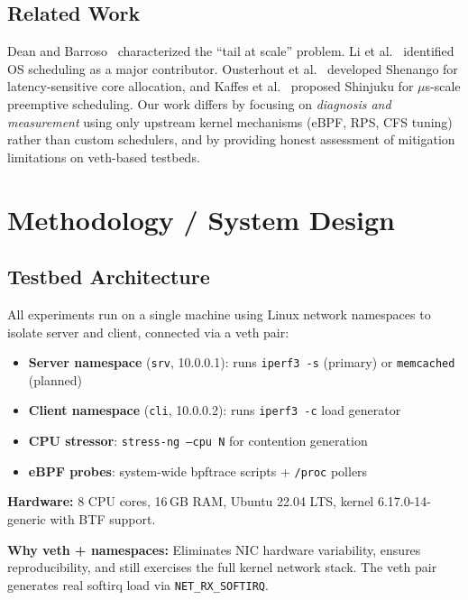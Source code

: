 \documentclass[11pt,a4paper]{article}
\begin{document}
\subsection{Related Work}

Dean and Barroso~\cite{dean2013tail} characterized the ``tail at scale'' problem. Li et al.~\cite{li2014tales} identified OS scheduling as a major contributor. Ousterhout et al.~\cite{ousterhout2019shenango} developed Shenango for latency-sensitive core allocation, and Kaffes et al.~\cite{kaffes2019shinjuku} proposed Shinjuku for $\mu$s-scale preemptive scheduling. Our work differs by focusing on \emph{diagnosis and measurement} using only upstream kernel mechanisms (eBPF, RPS, CFS tuning) rather than custom schedulers, and by providing honest assessment of mitigation limitations on veth-based testbeds.


\section{Methodology / System Design}
\label{sec:methodology}

\subsection{Testbed Architecture}

All experiments run on a single machine using Linux network namespaces to isolate server and client, connected via a veth pair:

\begin{itemize}[leftmargin=*]
  \item \textbf{Server namespace} (\texttt{srv}, 10.0.0.1): runs \texttt{iperf3 -s} (primary) or \texttt{memcached} (planned)
  \item \textbf{Client namespace} (\texttt{cli}, 10.0.0.2): runs \texttt{iperf3 -c} load generator
  \item \textbf{CPU stressor}: \texttt{stress-ng --cpu N} for contention generation
  \item \textbf{eBPF probes}: system-wide bpftrace scripts + \texttt{/proc} pollers
\end{itemize}

\textbf{Hardware:} 8 CPU cores, 16\,GB RAM, Ubuntu 22.04 LTS, kernel 6.17.0-14-generic with BTF support.

\textbf{Why veth + namespaces:} Eliminates NIC hardware variability, ensures reproducibility, and still exercises the full kernel network stack. The veth pair generates real softirq load via \texttt{NET\_RX\_SOFTIRQ}.
\end{document}
